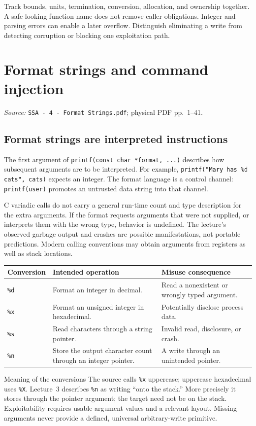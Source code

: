 \documentclass[11pt,a4paper]{article}
\newcommand{\currentmodule}{Contents}
\newcommand{\source}[2]{\textcolor{muted}{\small\textit{Source:} \nolinkurl{#1}; physical PDF pp.~#2.}\par\medskip}
\newcommand{\module}[2]{\par\Needspace{8\baselineskip}\gdef\currentmodule{#1}\section{#1}\label{#2}}
\numberwithin{figure}{section}
\begin{document}
\begin{takeaway}
Track bounds, units, termination, conversion, allocation, and ownership together. A safe-looking function name does not remove caller obligations. Integer and parsing errors can enable a later overflow. Distinguish eliminating a write from detecting corruption or blocking one exploitation path.
\end{takeaway}

\module{Format strings and command injection}{sec:format}
\source{SSA - 4 - Format Strings.pdf}{1--41}
\subsection{Format strings are interpreted instructions}
The first argument of \texttt{printf(const char *format, ...)} describes how subsequent arguments are to be interpreted. For example, \texttt{printf("Mary has \%d cats", cats)} expects an integer. The format language is a control channel: \texttt{printf(user)} promotes an untrusted data string into that channel.

C variadic calls do not carry a general run-time count and type description for the extra arguments. If the format requests arguments that were not supplied, or interprets them with the wrong type, behavior is undefined. The lecture's observed garbage output and crashes are possible manifestations, not portable predictions. Modern calling conventions may obtain arguments from registers as well as stack locations.

\par\noindent\begin{tabularx}{\linewidth}{@{}lYY@{}}\toprule
Conversion & Intended operation & Misuse consequence\\\midrule
\texttt{\%d} & Format an integer in decimal. & Read a nonexistent or wrongly typed argument.\\
\texttt{\%x} & Format an unsigned integer in hexadecimal. & Potentially disclose process data.\\
\texttt{\%s} & Read characters through a string pointer. & Invalid read, disclosure, or crash.\\
\texttt{\%n} & Store the output character count through an integer pointer. & A write through an unintended pointer.\\\bottomrule
\end{tabularx}\par

\begin{correction}{Meaning of the conversions}
The source calls \texttt{\%x} uppercase; uppercase hexadecimal uses \texttt{\%X}. Lecture~3 describes \texttt{\%n} as writing ``onto the stack.'' More precisely it stores through the pointer argument; the target need not be on the stack. Exploitability requires usable argument values and a relevant layout. Missing arguments never provide a defined, universal arbitrary-write primitive.
\end{correction}
\end{document}
